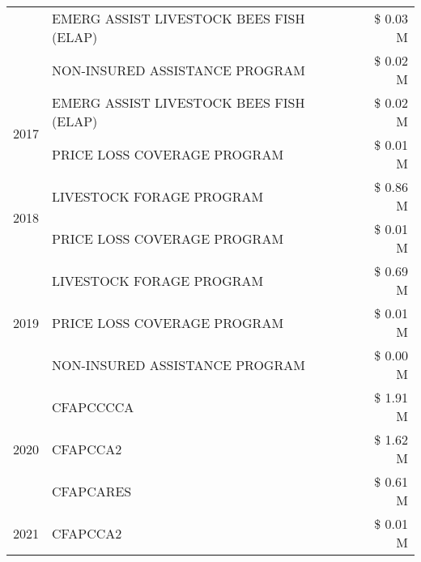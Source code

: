 \begin{tabular}{llr}
 & EMERG ASSIST LIVESTOCK BEES FISH (ELAP) & \$ 0.03 M \\
 & NON-INSURED ASSISTANCE PROGRAM & \$ 0.02 M \\
\cline{1-3}
\multirow[t]{2}{*}{2017} & EMERG ASSIST LIVESTOCK BEES FISH (ELAP) & \$ 0.02 M \\
 & PRICE LOSS COVERAGE PROGRAM & \$ 0.01 M \\
\cline{1-3}
\multirow[t]{2}{*}{2018} & LIVESTOCK FORAGE PROGRAM & \$ 0.86 M \\
 & PRICE LOSS COVERAGE PROGRAM & \$ 0.01 M \\
\cline{1-3}
\multirow[t]{3}{*}{2019} & LIVESTOCK FORAGE PROGRAM & \$ 0.69 M \\
 & PRICE LOSS COVERAGE PROGRAM & \$ 0.01 M \\
 & NON-INSURED ASSISTANCE PROGRAM & \$ 0.00 M \\
\cline{1-3}
\multirow[t]{3}{*}{2020} & CFAPCCCCA & \$ 1.91 M \\
 & CFAPCCA2 & \$ 1.62 M \\
 & CFAPCARES & \$ 0.61 M \\
\cline{1-3}
2021 & CFAPCCA2 & \$ 0.01 M \\
\cline{1-3}
\bottomrule
\end{tabular}

